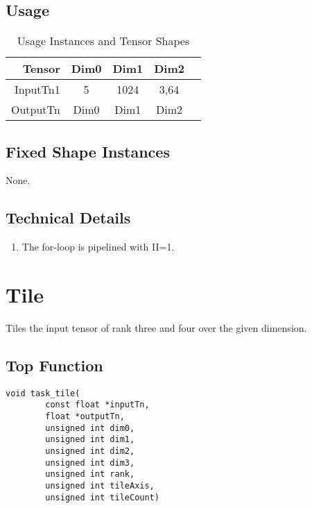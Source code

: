 \documentclass[•]{article}
\begin{document}
\subsection{Usage}
\begin{table}[htbp] %
\caption{Usage Instances and Tensor Shapes}
\label{tab:shapes_concat}
	\begin{center}
		\begin{tabular}{|r|c|c|c|c|} 
		\hline	
		Tensor & Dim0 & Dim1 & Dim2\\ 
		\hline	
		InputTn1 &
			5 &
			1024 &
			3,64\\ 
		\hline
		OutputTn &
			Dim0 & 
			Dim1 & 
			Dim2 \\
		\hline
		\end{tabular}
	\end{center}
\end{table}

\subsection{Fixed Shape Instances}
None.

\subsection{Technical Details}
\begin{enumerate}
\item The for-loop is pipelined with II=1.
\end{enumerate}










\pagebreak













\section{Tile}
Tiles the input tensor of rank three and four over the given dimension.

\subsection{Top Function}
\begin{lstlisting}
void task_tile(
		const float *inputTn,
		float *outputTn,
		unsigned int dim0,
		unsigned int dim1,
		unsigned int dim2,
		unsigned int dim3,
		unsigned int rank,
		unsigned int tileAxis,
		unsigned int tileCount)
\end{lstlisting}
\end{document}
